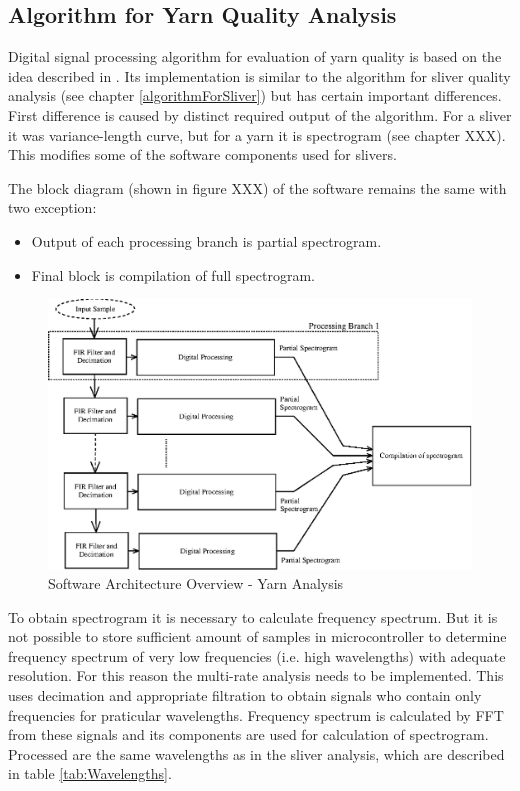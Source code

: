 \documentclass[twoside]{ctuthesis}
\theoremstyle{plain}
\theoremstyle{definition}
\theoremstyle{note}
\begin{document}
\subsection{Algorithm for Yarn Quality Analysis}
Digital signal processing algorithm for evaluation of yarn quality is based on the idea described in \cite{cite:1}. Its implementation is similar to the algorithm for sliver quality analysis (see chapter \ref{algorithmForSliver}) but has certain important differences. First difference is caused by distinct required output of the algorithm. For a sliver it was variance-length curve, but for a yarn it is spectrogram (see chapter XXX). This modifies some of the software components used for slivers.

The block diagram (shown in figure XXX) of the software remains the same with two exception:
\begin{itemize}
	\setlength{\itemsep}{5pt}
	\item Output of each processing branch is partial spectrogram. 
	\item Final block is compilation of full spectrogram.
\end{itemize}
\begin{figure}[h]
	\centering
	\includegraphics[width=1.0\textwidth]{system_overview_yarn.eps}
	\caption{Software Architecture Overview - Yarn Analysis}
	\label{fig:software_overview_yarn}
\end{figure}

To obtain spectrogram it is necessary to calculate frequency spectrum. But it is not possible to store sufficient amount of samples in microcontroller to determine frequency spectrum of very low frequencies (i.e. high wavelengths) with adequate resolution. For this reason the multi-rate analysis needs to be implemented. This uses decimation and appropriate filtration to obtain signals who contain only frequencies for praticular wavelengths. Frequency spectrum is calculated by FFT from these signals and its components are used for calculation of spectrogram. Processed are the same wavelengths as in the sliver analysis, which are described in table \ref{tab:Wavelengths}.
\end{document}
